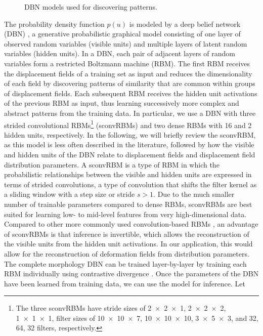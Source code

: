 \begin{figure}[tb]
\centering

\caption{DBN models used for discovering patterns.}
\end{figure}

The probability density function $p(u)$ is modeled by a deep belief network
(DBN) \cite{Hinton2006b}, a generative probabilistic graphical model consisting
of one layer of observed random variables (visible units) and multiple layers of
latent random variables (hidden units). In a DBN, each pair of adjacent layers
of random variables form a restricted Boltzmann machine (RBM). The first RBM
receives the displacement fields of a training set as input and reduces the
dimensionality of each field by discovering patterns of similarity that are
common within groups of displacement fields. Each subsequent RBM receives the
hidden unit activations of the previous RBM as input, thus learning successively
more complex and abstract patterns from the training data. In particular, we use
a DBN with three strided convolutional RBMs\footnote{The three sconvRBMs have
stride sizes of \num{2x2x1}, \num{2x2x2}, \num{1x1x1}, filter sizes of
\num{10x10x7}, \num{10x10x10}, \num{3x5x3}, and 32, 64, 32 filters,
respectively.} (sconvRBMs) and two dense RBMs \cite{Hinton2010} with 16 and 2
hidden units, respectively. In the following, we will briefly review the
sconvRBM, as this model is less often described in the literature, followed by
how the visible and hidden units of the DBN relate to displacement fields and
displacement field distribution parameters. A sconvRBM is a type of RBM in which
the probabilistic relationships between the visible and hidden units are
expressed in terms of strided convolutions, a type of convolution that shifts
the filter kernel as a sliding window with a step size or stride $s > 1$. Due to
the much smaller number of trainable parameters compared to dense RBMs,
sconvRBMs are best suited for learning low- to mid-level features from very
high-dimensional data. Compared to other more commonly used convolution-based
RBMs \cite{Lee2009}, an advantage of sconvRBMs is that inference is invertible,
which allows the reconstruction of the visible units from the hidden unit
activations. In our application, this would allow for the reconstruction of
deformation fields from distribution parameters. The complete morphology DBN can
be trained layer-by-layer by training each RBM individually using contrastive
divergence \cite{Hinton2006b}. Once the parameters of the DBN have been learned
from training data, we can use the model for inference. Let
